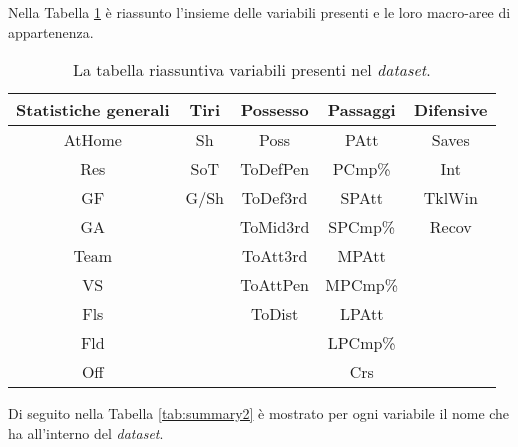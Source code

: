 Nella Tabella \ref{tab:summary} è riassunto l'insieme delle variabili presenti e le loro macro-aree di appartenenza.\\
	\begin{table}[!htb]%
	
	\renewcommand{\arraystretch}{1.7}
	\centering
	\begin{tabular}{c c c c c}
		\hline	
		
		\textbf{Statistiche generali} & \textbf{Tiri} & \textbf{Possesso} & \textbf{Passaggi} & \textbf{Difensive} \\	
		\hline			
		AtHome & Sh & Poss & PAtt & Saves\\
		Res & SoT & ToDefPen & PCmp\% & Int\\
		GF & G/Sh & ToDef3rd & SPAtt & TklWin\\
		GA &  & ToMid3rd & SPCmp\% & Recov\\
		Team &  & ToAtt3rd & MPAtt&\\
		VS &  & ToAttPen & MPCmp\% &\\
		Fls &  & ToDist & LPAtt &\\
		Fld &  &  & LPCmp\% &\\
		Off &  &  & Crs \\
		\hline

		
	\end{tabular} \hbox{}
	
	\caption{La tabella riassuntiva variabili presenti nel \emph{dataset}.} \label{tab:summary}
\end{table}

Di seguito nella Tabella \ref{tab:summary2} è mostrato per ogni variabile il nome che ha all'interno del \emph{dataset}.


